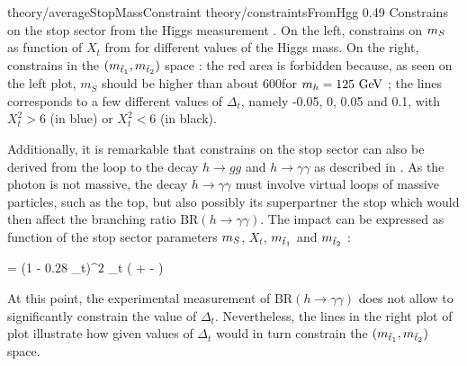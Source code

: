                          {theory/averageStopMassConstraint}
                         {theory/constraintsFromHgg}
                         {0.49}
                         {Constrains on the stop sector from the Higgs measurement \cite{TheLightStopWindow}.
                         On the left, constrains on $m_{S}$ as function of $X_t$ from
                         for different values of the Higgs mass. On the right, constrains
                         in the $(m_{\tilde{t}_1},m_{\tilde{t}_2})$ space : the
                         red area is forbidden because, as seen on the left plot, $m_S$
                         should be higher than about 600\GeV for $m_{h} = 125~\text{GeV}$ ;
                         the lines corresponds to a few different values of $\Delta_t$,
                         namely -0.05, 0, 0.05 and 0.1, with $X_t^2 > 6$ (in blue) or
                         $X_t^2 < 6$ (in black).
                         }

            Additionally, it is remarkable that constrains on the stop sector can also be derived
            from the loop to the decay $h \rightarrow gg$ and $h \rightarrow \gamma \gamma$
            as described in \cite{TheLightStopWindow}. As the photon is not massive,
            the decay $h \rightarrow \gamma \gamma$ must involve virtual loops of massive
            particles, such as the top, but also possibly its superpartner the stop which
            would then affect the branching ratio $\text{BR}(h \rightarrow \gamma\gamma)$.
            The impact can be expressed as function of the stop sector parameters $m_{S}$,
            $X_t$, $m_{\tilde{t}_1}$ and $m_{\tilde{t}_2}$ :

            {
                =
                (1 - 0.28 \Delta_t)^2
                \hspace*{0.5cm}
                \hspace*{0.5cm}
                \Delta_t
                \approx
                \left(
                    +
                    -
                \right)
            }

            At this point, the experimental measurement of $\text{BR}(h\rightarrow\gamma\gamma)$
            does not allow to significantly constrain the value of $\Delta_t$. Nevertheless,
            the lines in the right plot of  plot illustrate
            how given values of $\Delta_t$ would in turn constrain the
            $(m_{\tilde{t}_1},m_{\tilde{t}_2})$ space.

